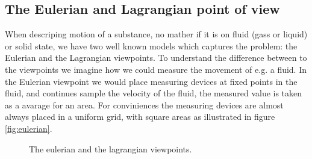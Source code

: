 
\subsection{The Eulerian and Lagrangian point of view}

When descriping motion of a substance, no mather if it is on fluid
(gass or liquid) or solid state, we have two well known models which
captures the problem: the Eulerian and the Lagrangian viewpoints. To
understand the difference between to the viewpoints we imagine how we
could measure the movement of e.g. a fluid. In the Eulerian viewpoint
we would place measuring devices at fixed points in the fluid, and
continues sample the velocity of the fluid, the measured value is
taken as a avarage for an area. For conviniences the measuring devices
are almost always placed in a uniform grid, with square areas as
illustrated in figure \ref{fig:eulerian}.

\begin{figure}[h]
  \centering
  \caption{The eulerian and the lagrangian viewpoints.}
  \label{fig:eulerian-lagrangian}
\end{figure}

